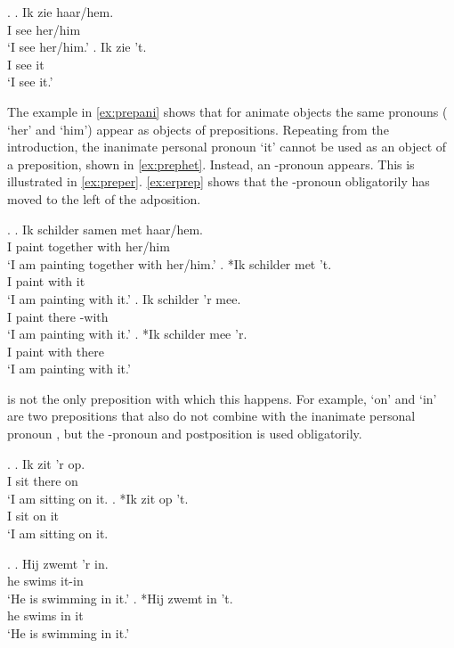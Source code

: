 \documentclass[12pt]{article}
\begin{document}
 \ex. \label{ex:objverb}
 \ag. Ik zie haar/hem.\\
  I see her/him\\
  `I see her/him.'\label{ex:aniobj}
 \bg. Ik zie 't.\\
  I see it\\
  `I see it.'\label{ex:inaniobj}

The example in \ref{ex:prepani} shows that for animate objects the same pronouns ( `her' and  `him') appear as objects of prepositions. Repeating from the introduction, the inanimate personal pronoun  `it' cannot be used as an object of a preposition, shown in \ref{ex:prephet}. Instead, an -pronoun appears. This is illustrated in \ref{ex:preper}. \ref{ex:erprep} shows that the -pronoun obligatorily has moved to the left of the adposition.

\ex. \label{ex:objprep}
\ag. Ik schilder samen met haar/hem.\\
 I paint together with her/him\\
 `I am painting together with her/him.'\label{ex:prepani}
\bg. *Ik schilder met 't.\\
 I paint with it\\
 `I am painting with it.'\label{ex:prephet}
\bg. Ik schilder 'r mee.\\
 I paint there -with\\
 `I am painting with it.'\label{ex:preper}
\bg. *Ik schilder mee 'r.\\
 I paint with there\\
 `I am painting with it.'\label{ex:erprep}

 is not the only preposition with which this happens. For example,  `on' and  `in' are two prepositions that also do not combine with the inanimate personal pronoun , but the -pronoun and postposition is used obligatorily.

\ex.
\ag. Ik zit 'r op.\\
 I sit there on\\
 `I am sitting on it.
\bg. *Ik zit op 't.\\
 I sit on it\\
 `I am sitting on it.

\ex.
 \ag. Hij zwemt 'r in.\\
  he swims it-in\\
  `He is swimming in it.'
 \bg. *Hij zwemt in 't.\\
  he swims in it\\
  `He is swimming in it.'
\end{document}
